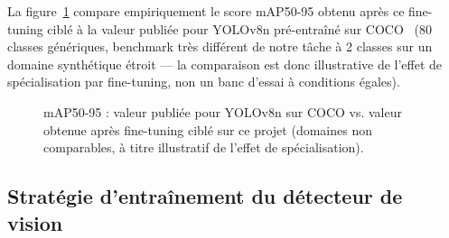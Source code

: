 \documentclass[12pt,a4paper,titlepage]{article}
\begin{document}
La figure~\ref{fig:chart_map} compare empiriquement le score mAP50-95 obtenu après ce fine-tuning ciblé à la valeur publiée pour YOLOv8n pré-entraîné sur COCO~\cite{ultralytics_yolov8} (80 classes génériques, benchmark très différent de notre tâche à 2 classes sur un domaine synthétique étroit --- la comparaison est donc illustrative de l'effet de spécialisation par fine-tuning, non un banc d'essai à conditions égales).

\begin{figure}[H]
    \centering
    \caption{mAP50-95 : valeur publiée pour YOLOv8n sur COCO vs. valeur obtenue après fine-tuning ciblé sur ce projet (domaines non comparables, à titre illustratif de l'effet de spécialisation).}
    \label{fig:chart_map}
\end{figure}

\subsection{Stratégie d'entraînement du détecteur de vision}
\label{subsec:choix_vision_strategie}
\end{document}

